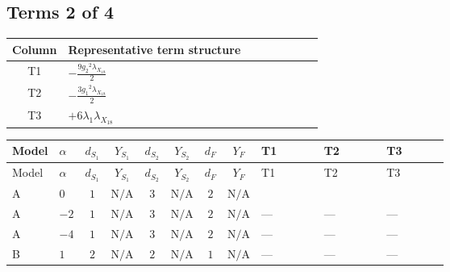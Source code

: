 \documentclass[8pt]{article}
\begin{document}
\begin{landscape}
\subsection*{Terms 2 of 4}
\begin{center}
\begin{tabular}{@{}c >{\raggedright\arraybackslash}p{0.82\linewidth}@{}}
\toprule
Column & Representative term structure \\
\midrule
T1 & \(\displaystyle -\frac{9 {g_2}^2 {\lambda_{X_{18}}}}{2}\) \\
\midrule
T2 & \(\displaystyle -\frac{3 {g_1}^2 {\lambda_{X_{18}}}}{2}\) \\
\midrule
T3 & \(\displaystyle +6 {\lambda_1} {\lambda_{X_{18}}}\) \\
\midrule
\bottomrule
\end{tabular}
\end{center}
\smallskip
\tiny
\begin{longtable}{@{}llcccccc >{\raggedright\arraybackslash}p{0.21\linewidth} >{\raggedright\arraybackslash}p{0.21\linewidth} >{\raggedright\arraybackslash}p{0.21\linewidth}@{}}
\toprule
Model & $\alpha$ & $d_{S_1}$ & $Y_{S_1}$ & $d_{S_2}$ & $Y_{S_2}$ & $d_F$ & $Y_F$ & T1 & T2 & T3 \\
\midrule
\endfirsthead
\toprule
Model & $\alpha$ & $d_{S_1}$ & $Y_{S_1}$ & $d_{S_2}$ & $Y_{S_2}$ & $d_F$ & $Y_F$ & T1 & T2 & T3 \\
\midrule
\endhead
A & $0$ & $1$ & $\text{N/A}$ & $3$ & $\text{N/A}$ & $2$ & $\text{N/A}$ & \scriptsize\adjustbox{max width=\linewidth}{$\begin{gathered} -\frac{9 {g_2}^2 {\lambda_{X_{18}}}}{2}\end{gathered}$} & \scriptsize\adjustbox{max width=\linewidth}{$\begin{gathered} -\frac{3 {g_1}^2 {\lambda_{X_{18}}}}{2}\end{gathered}$} & \scriptsize\adjustbox{max width=\linewidth}{$\begin{gathered} +6 {\lambda_1} {\lambda_{X_{18}}}\end{gathered}$} \\
\midrule
A & $-2$ & $1$ & $\text{N/A}$ & $3$ & $\text{N/A}$ & $2$ & $\text{N/A}$ & --- & --- & --- \\
\midrule
A & $-4$ & $1$ & $\text{N/A}$ & $3$ & $\text{N/A}$ & $2$ & $\text{N/A}$ & --- & --- & --- \\
\midrule
B & $1$ & $2$ & $\text{N/A}$ & $2$ & $\text{N/A}$ & $1$ & $\text{N/A}$ & --- & --- & --- \\

\end{longtable}
\end{landscape}
\end{document}
